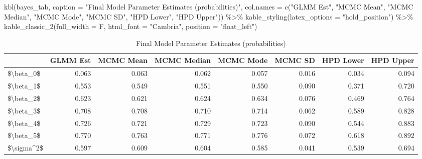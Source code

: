 \documentclass[
]{article}
\newenvironment{Shaded}{\begin{snugshade}}{\end{snugshade}}
\newcommand{\AttributeTok}[1]{\textcolor[rgb]{0.77,0.63,0.00}{#1}}
\newcommand{\FunctionTok}[1]{\textcolor[rgb]{0.00,0.00,0.00}{#1}}
\newcommand{\NormalTok}[1]{#1}
\newcommand{\SpecialCharTok}[1]{\textcolor[rgb]{0.00,0.00,0.00}{#1}}
\newcommand{\StringTok}[1]{\textcolor[rgb]{0.31,0.60,0.02}{#1}}
\begin{document}
\begin{Shaded}
\begin{Highlighting}[]
\FunctionTok{kbl}\NormalTok{(bayes\_tab,}
    \AttributeTok{caption =} \StringTok{"Final Model Parameter Estimates (probabilities)"}\NormalTok{,}
    \AttributeTok{col.names =} \FunctionTok{c}\NormalTok{(}\StringTok{"GLMM Est"}\NormalTok{, }\StringTok{"MCMC Mean"}\NormalTok{, }\StringTok{"MCMC Median"}\NormalTok{, }\StringTok{"MCMC Mode"}\NormalTok{, }\StringTok{"MCMC SD"}\NormalTok{, }\StringTok{"HPD Lower"}\NormalTok{, }\StringTok{"HPD Upper"}\NormalTok{)) }\SpecialCharTok{\%\textgreater{}\%}
  \FunctionTok{kable\_styling}\NormalTok{(}\AttributeTok{latex\_options =} \StringTok{"hold\_position"}\NormalTok{) }\SpecialCharTok{\%\textgreater{}\%}
  \FunctionTok{kable\_classic\_2}\NormalTok{(}\AttributeTok{full\_width =}\NormalTok{ F, }\AttributeTok{html\_font =} \StringTok{"Cambria"}\NormalTok{, }\AttributeTok{position =} \StringTok{"float\_left"}\NormalTok{)}
\end{Highlighting}
\end{Shaded}

\begin{table}

\caption{\label{tab:bayes_tab}Final Model Parameter Estimates (probabilities)}
\centering
\begin{tabular}[t]{l|r|r|r|r|r|r|r}
\hline
  & GLMM Est & MCMC Mean & MCMC Median & MCMC Mode & MCMC SD & HPD Lower & HPD Upper\\
\hline
\$\textbackslash{}beta\_0\$ & 0.063 & 0.063 & 0.062 & 0.057 & 0.016 & 0.034 & 0.094\\
\hline
\$\textbackslash{}beta\_1\$ & 0.553 & 0.549 & 0.551 & 0.550 & 0.090 & 0.371 & 0.720\\
\hline
\$\textbackslash{}beta\_2\$ & 0.623 & 0.621 & 0.624 & 0.634 & 0.076 & 0.469 & 0.764\\
\hline
\$\textbackslash{}beta\_3\$ & 0.708 & 0.708 & 0.710 & 0.714 & 0.062 & 0.589 & 0.828\\
\hline
\$\textbackslash{}beta\_4\$ & 0.726 & 0.721 & 0.729 & 0.723 & 0.090 & 0.544 & 0.883\\
\hline
\$\textbackslash{}beta\_5\$ & 0.770 & 0.763 & 0.771 & 0.776 & 0.072 & 0.618 & 0.892\\
\hline
\$\textbackslash{}sigma\textasciicircum{}2\$ & 0.597 & 0.609 & 0.604 & 0.585 & 0.041 & 0.539 & 0.694\\
\hline
\end{tabular}
\end{table}
\end{document}
